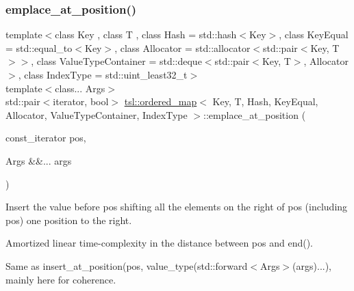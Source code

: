 \subsubsection{\texorpdfstring{emplace\_at\_position()}{emplace\_at\_position()}}
{\footnotesize\ttfamily template$<$class Key , class T , class Hash  = std\+::hash$<$\+Key$>$, class Key\+Equal  = std\+::equal\+\_\+to$<$\+Key$>$, class Allocator  = std\+::allocator$<$std\+::pair$<$\+Key, T$>$$>$, class Value\+Type\+Container  = std\+::deque$<$std\+::pair$<$\+Key, T$>$, Allocator$>$, class Index\+Type  = std\+::uint\+\_\+least32\+\_\+t$>$ \\
template$<$class... Args$>$ \\
std\+::pair$<$iterator, bool$>$ \mbox{\hyperlink{classtsl_1_1ordered__map}{tsl\+::ordered\+\_\+map}}$<$ Key, T, Hash, Key\+Equal, Allocator, Value\+Type\+Container, Index\+Type $>$\+::emplace\+\_\+at\+\_\+position (\begin{DoxyParamCaption}\item[{const\+\_\+iterator}]{pos,  }\item[{Args \&\&...}]{args }\end{DoxyParamCaption})\hspace{0.3cm}{\ttfamily [inline]}}





Insert the value before pos shifting all the elements on the right of pos (including pos) one position to the right.

Amortized linear time-\/complexity in the distance between pos and end().

Same as insert\+\_\+at\+\_\+position(pos, value\+\_\+type(std\+::forward$<$\+Args$>$(args)...), mainly here for coherence. \mbox{\label{classtsl_1_1ordered__map_a731379d1d7ea46787e4dc5c7a35d9d76}} 
